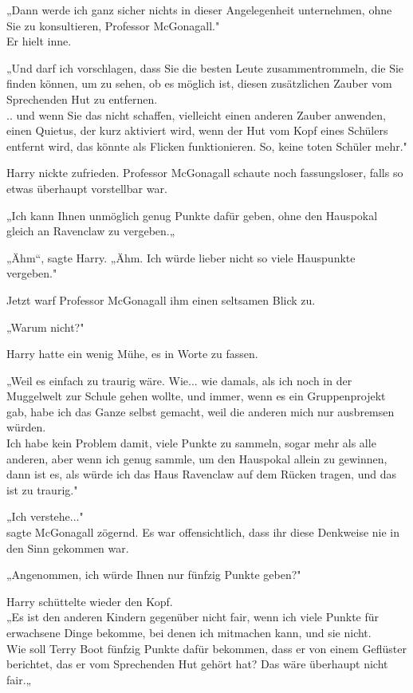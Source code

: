 {„Dann werde ich ganz sicher nichts in dieser Angelegenheit unternehmen, ohne Sie zu konsultieren, Professor McGonagall."\\ Er hielt inne.

„Und darf ich vorschlagen, dass Sie die besten Leute zusammentrommeln, die Sie finden können, um zu sehen, ob es möglich ist, diesen zusätzlichen Zauber vom Sprechenden Hut zu entfernen.\\ .. und wenn Sie das nicht schaffen, vielleicht einen anderen Zauber anwenden, einen Quietus, der kurz aktiviert wird, wenn der Hut vom Kopf eines Schülers entfernt wird, das könnte als Flicken funktionieren. So, keine toten Schüler mehr."

Harry nickte zufrieden. Professor McGonagall schaute noch fassungsloser, falls so etwas überhaupt vorstellbar war.

„Ich kann Ihnen unmöglich genug Punkte dafür geben, ohne den Hauspokal gleich an Ravenclaw zu vergeben.„

„Ähm“, sagte Harry. „Ähm. Ich würde lieber nicht so viele Hauspunkte vergeben."

Jetzt warf Professor McGonagall ihm einen seltsamen Blick zu.

„Warum nicht?"

Harry hatte ein wenig Mühe, es in Worte zu fassen.

„Weil es einfach zu traurig wäre. Wie... wie damals, als ich noch in der Muggelwelt zur Schule gehen wollte, und immer, wenn es ein Gruppenprojekt gab, habe ich das Ganze selbst gemacht, weil die anderen mich nur ausbremsen würden.\\ Ich habe kein Problem damit, viele Punkte zu sammeln, sogar mehr als alle anderen, aber wenn ich genug sammle, um den Hauspokal allein zu gewinnen, dann ist es, als würde ich das Haus Ravenclaw auf dem Rücken tragen, und das ist zu traurig."

„Ich verstehe..."\\ sagte McGonagall zögernd. Es war offensichtlich, dass ihr diese Denkweise nie in den Sinn gekommen war.

„Angenommen, ich würde Ihnen nur fünfzig Punkte geben?"

Harry schüttelte wieder den Kopf.\\ „Es ist den anderen Kindern gegenüber nicht fair, wenn ich viele Punkte für erwachsene Dinge bekomme, bei denen ich mitmachen kann, und sie nicht.\\ Wie soll Terry Boot fünfzig Punkte dafür bekommen, dass er von einem Geflüster berichtet, das er vom Sprechenden Hut gehört hat? Das wäre überhaupt nicht fair.„

}
